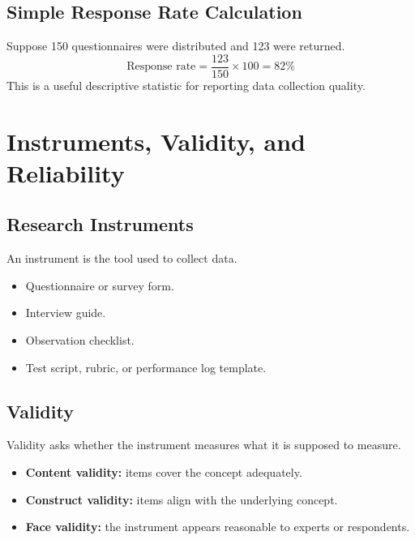 \documentclass[11pt,a4paper]{article}
\begin{document}
\subsection{Simple Response Rate Calculation}

\begin{examplebox}
Suppose 150 questionnaires were distributed and 123 were returned.
\[
\text{Response rate} = \frac{123}{150} \times 100 = 82\%
\]
This is a useful descriptive statistic for reporting data collection quality.
\end{examplebox}

\section{Instruments, Validity, and Reliability}

\subsection{Research Instruments}

An instrument is the tool used to collect data.

\begin{itemize}[leftmargin=*]
  \item Questionnaire or survey form.
  \item Interview guide.
  \item Observation checklist.
  \item Test script, rubric, or performance log template.
\end{itemize}

\subsection{Validity}

Validity asks whether the instrument measures what it is supposed to measure.

\begin{itemize}[leftmargin=*]
  \item \textbf{Content validity:} items cover the concept adequately.
  \item \textbf{Construct validity:} items align with the underlying concept.
  \item \textbf{Face validity:} the instrument appears reasonable to experts or respondents.
\end{itemize}
\end{document}
